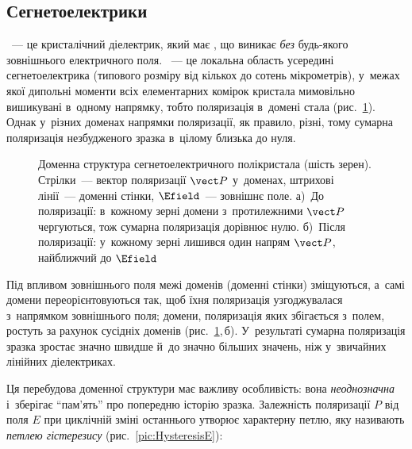 \subsection*{Сегнетоелектрики}\label{sec:FE}


~--- це кристалічний діелектрик, який має
, що виникає \emph{без} будь-якого
зовнішнього електричного поля. ~--- це
локальна область усередині сегнетоелектрика (типового розміру від кількох до сотень
мікрометрів), у~межах якої дипольні моменти всіх елементарних комірок кристала мимовільно
вишикувані в~одному напрямку, тобто поляризація в~домені стала (рис.~\ref{pic:DomainsE}).
Однак у~різних доменах напрямки поляризації, як правило, різні, тому сумарна поляризація
незбудженого зразка в~цілому близька до нуля.

\begin{figure}[tbp]\centering
	\caption{Доменна структура сегнетоелектричного полікристала (шість зерен). Стрілки~---
		вектор поляризації $\vect P$ у~доменах, штрихові лінії~--- доменні стінки, $\Efield$~---
		зовнішнє поле. а)~До поляризації: в~кожному зерні домени з~протилежними $\vect P$
		чергуються, тож сумарна поляризація дорівнює нулю. б)~Після поляризації: у~кожному
		зерні лишився один напрям $\vect P$, найближчий до $\Efield$\label{pic:DomainsE}}
\end{figure}

Під впливом зовнішнього поля межі доменів (доменні стінки) зміщуються, а~самі домени
переорієнтовуються так, щоб їхня поляризація узгоджувалася з~напрямком зовнішнього поля;
домени, поляризація яких збігається з~полем, ростуть за рахунок сусідніх доменів
(рис.~\ref{pic:DomainsE},\,б). У~результаті
сумарна поляризація зразка зростає значно швидше й~до значно більших значень, ніж
у~звичайних лінійних діелектриках.

Ця перебудова доменної структури має важливу особливість: вона \emph{неоднозначна}
і~зберігає \enquote{пам'ять} про попередню історію зразка. Залежність поляризації $P$ від
поля $E$ при циклічній зміні останнього утворює характерну петлю, яку називають
\emph{петлею гістерезису} (рис.~\ref{pic:HysteresisE}):

